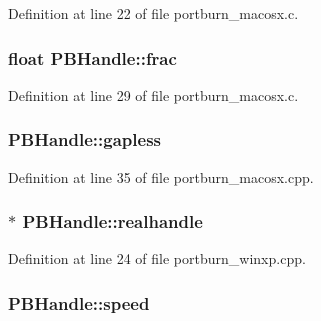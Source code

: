 Definition at line 22 of file portburn\+\_\+macosx.\+c.

\subsubsection[{\texorpdfstring{frac}{frac}}]{\setlength{\rightskip}{0pt plus 5cm}float P\+B\+Handle\+::frac}\hypertarget{struct_p_b_handle_a0cb1ec04f264e77d67ac50f10cd83b43}{}\label{struct_p_b_handle_a0cb1ec04f264e77d67ac50f10cd83b43}


Definition at line 29 of file portburn\+\_\+macosx.\+c.

\subsubsection[{\texorpdfstring{gapless}{gapless}}]{ P\+B\+Handle\+::gapless}\hypertarget{struct_p_b_handle_aae7ec727582fe8d6e3185024a80a4235}{}\label{struct_p_b_handle_aae7ec727582fe8d6e3185024a80a4235}


Definition at line 35 of file portburn\+\_\+macosx.\+cpp.

\subsubsection[{\texorpdfstring{realhandle}{realhandle}}]{$\ast$ P\+B\+Handle\+::realhandle}\hypertarget{struct_p_b_handle_a46e452618a7586428e9c32779bcd9f20}{}\label{struct_p_b_handle_a46e452618a7586428e9c32779bcd9f20}


Definition at line 24 of file portburn\+\_\+winxp.\+cpp.

\subsubsection[{\texorpdfstring{speed}{speed}}]{ P\+B\+Handle\+::speed}\hypertarget{struct_p_b_handle_a641d9dca452330d9cb5ce167acb5376f}{}\label{struct_p_b_handle_a641d9dca452330d9cb5ce167acb5376f}


